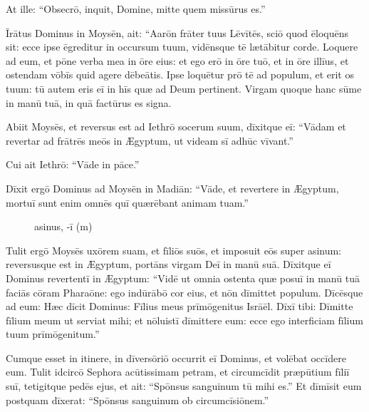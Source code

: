 At ille: ``Obsecrō, inquit, Domine,
mitte quem missūrus es.''

Īrātus Dominus in Moysēn, ait: ``Aarōn frāter tuus Lēvītēs,
sciō quod ēloquēns sit: ecce ipse ēgreditur in occursum tuum,
vidēnsque tē lætābitur corde.
Loquere ad eum, et pōne verba mea in ōre eius:
et ego erō in ōre tuō, et in ōre illīus,
et ostendam vōbīs quid agere dēbeātis.
Ipse loquētur prō tē ad populum,
et erit os tuum:
tū autem eris eī in hīs quæ ad Deum pertinent.
Virgam quoque hanc sūme in manū tuā,
in quā factūrus es signa.

Abiit Moysēs, et reversus est ad Iethrō socerum suum,
dīxitque eī: ``Vādam et revertar ad frātrēs meōs in Ægyptum,
ut videam sī adhūc vīvant.''

Cui ait Iethrō: ``Vāde in pāce.''

Dīxit ergō Dominus ad Moysēn in Madiān: ``Vāde, et revertere in Ægyptum,
mortuī sunt enim omnēs quī quærēbant animam tuam.''

\begin{figure}[hbp]
        \centering
        \setlength{\fboxsep}{0pt}
        \caption{asinus, -ī (m)}
\end{figure}
Tulit ergō Moysēs uxōrem suam, et fīliōs suōs,
et imposuit eōs super asinum: reversusque est in Ægyptum,
portāns virgam Deī in manū suā. Dīxitque eī Dominus revertentī
in Ægyptum: ``Vidē ut omnia ostenta quæ posuī in manū tuā
faciās cōram Pharaōne: ego indūrābō cor eius,
et nōn dīmittet populum. Dīcēsque ad eum: Hæc
dīcit Dominus: Fīlius meus prīmōgenitus Isrāēl.
Dīxī tibi: Dīmitte fīlium meum ut serviat mihi;
et nōluistī dīmittere eum:
ecce ego interficiam fīlium tuum prīmōgenitum.''

Cumque esset in itinere, in dīversōriō
occurrit eī Dominus, et volēbat occīdere eum. 
Tulit idcircō Sephora acūtissimam petram,
et circumcīdit præpūtium fīliī suī, tetigitque pedēs ejus,
et ait: ``Spōnsus sanguinum tū mihi es.''
Et dīmīsit eum postquam dīxerat: ``Spōnsus sanguinum ob circumcīsiōnem.''

